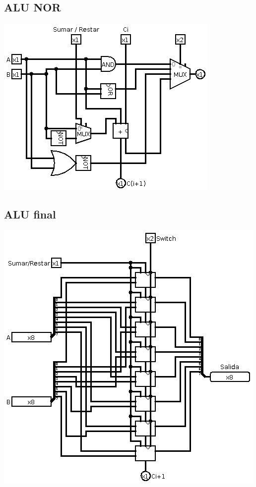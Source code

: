 \documentclass[12pt, letterpaper]{article}
\begin{document}
      \subsection*{ALU NOR}

        \begin{center}
          \includegraphics[scale=0.6]{alu_nor.png}
        \end{center}

      \subsection*{ALU final}

        \begin{center}
          \includegraphics[scale=0.6]{alu_f.png}
        \end{center}
\end{document}
